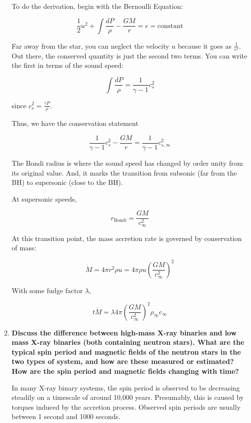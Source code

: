 \documentclass[12pt, letterpaper, preprint]{aastex}
\begin{document}
\begin{enumerate}
To do the derivation, begin with the Bernoulli Equation:

\begin{equation}
\frac{1}{2} u^2 + \int \frac{dP}{\rho} - \frac{GM}{r} = e = \mathrm{constant}
\end{equation}

Far away from the star, you can neglect the velocity $u$ because it goes as $\frac{1}{r^4}$. Out there, the conserved quantity is just the second two terms. You can write the first in terms of the sound speed:

$$ \int \frac{dP}{\rho} = \frac{1}{\gamma-1} c_s^2 $$

since $c_s^2 = \frac{\gamma P}{\rho}$. 

Thus, we have the conservation statement

$$ \frac{1}{\gamma-1} c_s^2 - \frac{GM}{r} = \frac{1}{\gamma-1} c_{s,\infty}^2 $$

The Bondi radius is where the sound speed has changed by order unity from its original value. And, it marks the transition from subsonic (far from the BH) to supersonic (close to the BH). 

At supersonic speeds, 

\begin{equation}
r_\mathrm{Bondi} = \frac{GM}{c^2_\infty}
\end{equation}

At this transition point, the mass accretion rate is governed by conservation of mass:

$$ \dot{M} = 4 \pi r^2 \rho u = 4 \pi \rho u \left(\frac{GM}{c^2_\infty}\right)^2 $$

With some fudge factor $\lambda$,

\begin{equation}t
\dot{M} = \lambda 4 \pi \left(\frac{GM}{c^2_\infty}\right)^2 \rho_\infty c_\infty
\end{equation}

\newpage

\item \textbf{Discuss the difference between high-mass X-ray binaries and low mass X-ray binaries (both containing neutron stars). What are the typical spin period and magnetic fields of the neutron stars in the two types of system, and how are these measured or estimated? How are the spin period and magnetic fields changing with time?}

In many X-ray binary systems, the spin period is observed to be decreasing steadily on a timescale of around 10,000 years. Presumably, this is caused by torques induced by the accretion process. Observed spin periods are usually between 1 second and 1000 seconds. 


\end{enumerate}
\end{document}
